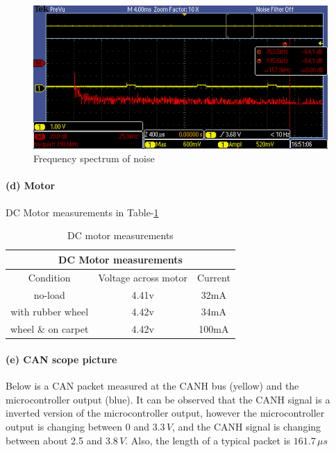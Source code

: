 \documentclass[a4paper]{article}
\newlength{\pic}
\begin{document}
\setlength{\pic}{0.8\textwidth}
\begin{figure}[htp]
\center
\includegraphics[width=\pic]{scope/ir_fft}
\caption{Frequency spectrum of noise}
\label{noise}
\end{figure}


\paragraph{(d) Motor} DC Motor measurements in Table-\ref{tab3}
\begin{table}
\center
  \begin{tabular}{|c|c|c|}
    \hline
    \multicolumn{3}{|c|}{DC Motor measurements} \\
    \hline
    Condition & Voltage across motor & Current \\
    \hline
	no-load				&	4.41v &	32mA \\
	with rubber wheel	&	4.42v &	34mA \\
	wheel \& on carpet	&   4.42v & 100mA \\
    \hline
  \end{tabular}
  \caption{DC motor measurements}
  \label{tab3}
\end{table}


\paragraph{(e) CAN scope picture} Below is a CAN packet measured at the CANH bus (yellow) and the microcontroller output (blue). It can be observed that the CANH signal is a inverted version of the microcontroller output, however the 
microcontroller output is changing between 0 and $3.3 \, V$, and the CANH signal is changing between about 2.5 and $3.8 \, V$.
Also, the length of a typical packet is $ 161.7 \, \mu s $
\end{document}
